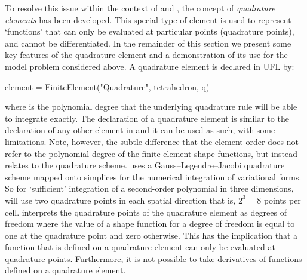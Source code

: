 To resolve this issue within the context of \ufl and \ffc, the concept
of \emph{quadrature elements}  has been developed.
This special type of element is used to represent `functions' that can only
be evaluated at particular points (quadrature points), and cannot be
differentiated. In the remainder of this section we present some key features
of the quadrature element and a demonstration of its use for the model problem
considered above.  A quadrature element is declared in UFL by:
%
\begin{python}
element = FiniteElement("Quadrature", tetrahedron, q)
\end{python}
%
where  is the polynomial degree that the underlying quadrature
rule will be able to integrate exactly.  The declaration of a quadrature
element is similar to the declaration of any other element in \ufl
and it can be used as such, with some limitations. Note, however,
the subtle difference that the element order does not refer to the
polynomial degree of the finite element shape functions, but instead
relates to the quadrature scheme.  \ffc{} uses a Gauss--Legendre--Jacobi
quadrature scheme mapped onto simplices for the numerical integration of
variational forms.  So for `sufficient' integration of a second-order
polynomial in three dimensions, \ffc{} will use two quadrature points
in each spatial direction that is, $2^3 = 8$ points per cell.  \ffc{}
interprets the quadrature points of the quadrature element as degrees of
freedom where the value of a shape function for a degree of freedom is
equal to one at the quadrature point and zero otherwise.  This has the
implication that a function that is defined on a quadrature element can
only be evaluated at quadrature points.  Furthermore, it is not possible
to take derivatives of functions defined on a quadrature element.

